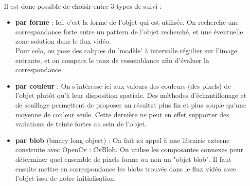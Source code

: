 \documentclass{article}
\begin{document}
\paragraph{}
Il est donc possible de choisir entre 3 types de suivi : \\
\begin{itemize}
\item {\textbf{par forme} : } Ici, c'est la forme de l'objet qui est utilisée. On recherche une correspondance forte entre un pattern de l'objet recherché, et une éventuelle zone solution dans le flux vidéo. \\
Pour cela, on pose des calques du 'modèle' à intervalle régulier sur l'image entrante, et on compare le taux de ressemblance afin d'évaluer la correspondance.\\
\item {\textbf{par couleur} : } On s'intéresse ici aux valeurs des couleurs (des pixels) de l'objet plutôt qu'à leur disposition spatiale. Des méthodes d'échantillonage et de seuillage permettent de proposer un résultat plus fin et plus souple qu'une moyenne de couleur seule. Cette dernière ne peut en effet supporter des variations de teinte fortes au sein de l'objet.\\
\item {\textbf{par blob} (binary long object) : } On fait ici appel à une librairie externe construite avec OpenCv : CvBlob. On utilise les composantes connexes pour déterminer quel ensemble de pixels forme ou non un "objet blob". Il faut ensuite mettre en correspondance les blobs trouvés dans le flux vidéo avec l'objet issu de notre initialisation.
\end{itemize}
\end{document}
